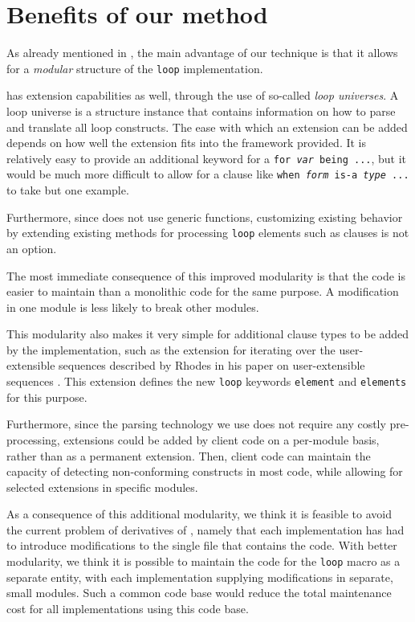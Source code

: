 \section{Benefits of our method}
\label{sec-benefits}
 
As already mentioned in ,
the main advantage of our technique is that it allows for a
\emph{modular} structure of the \texttt{loop} implementation.

\mitloop{} has extension capabilities as well, through the use of
so-called \emph{loop universes}.  A loop universe is a structure
instance that contains information on how to parse and translate all
loop constructs.  The ease with which an extension can be added
depends on how well the extension fits into the framework provided.
It is relatively easy to provide an additional keyword for a
\texttt{for \emph{var} being ...}, but it would be much more difficult
to allow for a clause like \texttt{when \emph{form} is-a \emph{type}
  ...} to take but one example.

Furthermore, since \mitloop{} does not use generic functions,
customizing existing behavior by extending existing methods for
processing \texttt{loop} elements such as clauses is not an option.

The most immediate consequence of this improved modularity is that the
code is easier to maintain than a monolithic code for the same
purpose.  A modification in one module is less likely to break other
modules.

This modularity also makes it very simple for additional clause types
to be added by the \commonlisp{} implementation, such as the extension
for iterating over the user-extensible sequences described by Rhodes
in his paper on user-extensible sequences
\cite{Rhodes:2007:USC:1622123.1622138}.  This extension defines the
new \texttt{loop} keywords \texttt{element} and \texttt{elements} for
this purpose.

Furthermore, since the parsing technology we use does not require any
costly pre-processing, extensions could be added by client code on a
per-module basis, rather than as a permanent extension.  Then, client
code can maintain the capacity of detecting non-conforming constructs
in most code, while allowing for selected extensions in specific
modules.

As a consequence of this additional modularity, we think it is
feasible to avoid the current problem of derivatives of \mitloop{},
namely that each implementation has had to introduce modifications to
the single file that contains the code.  With better modularity, we
think it is possible to maintain the code for the \texttt{loop} macro
as a separate entity, with each \commonlisp{} implementation supplying
modifications in separate, small modules.  Such a common code base
would reduce the total maintenance cost for all \commonlisp{}
implementations using this code base.
